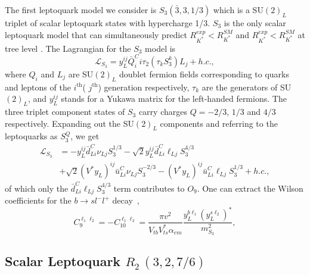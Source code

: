 \documentclass[12pt]{revtex4-2}
\numberwithin{equation}{section}
\begin{document}
 The first leptoquark model we consider is $S_{3}(\bar{3},3,1/3)$ which is a SU$(2)_L$ triplet of scalar leptoquark states with hypercharge 1/3. $S_{3}$ is the only scalar leptoquark model that can simultaneously predict $R_{K^{*}}^{exp} < R_{K^{*}}^{SM}$ and $R_{K^{*}}^{exp} < R_{K^{*}}^{SM}$ at tree level \cite{Dorsner:2017ufx, Hiller:2014yaa, Hiller:2017bzc, Hati:2018fzc}. The Lagrangian for the $S_{3}$ model is
\begin{equation}
    \mathcal{L}_{S_{3}} = y^{ij}_{L}\bar{Q}^{C}_{i}i\tau_{2}(\tau_{k}S^{k}_{3})L_{j} + h.c.,
\end{equation}
where $Q_i$ and $L_j$ are SU$(2)_L$ doublet fermion fields corresponding to quarks and leptons of the $i^\mathrm{th}$(  $j^\mathrm{th}$) generation respectively, $\tau_{k}$ are the generators of SU$(2)_L$, and $y_{L}^{ij}$ stands for a Yukawa matrix for the left-handed fermions.
The three triplet component states of $S_3$ carry charges $Q = -2/3$, $1/3$ and $4/3$ respectively.  Expanding out the SU$(2)_L$ components and referring to the leptoquarks as $S_3^Q$, we get 
\begin{align}\nonumber
    \mathcal{L}_{S_{3}} &= -y^{ij}_{L} \bar d^C_{Li} \nu_{Lj} S_{3}^{1/3} - \sqrt{2}y_{L}^{ij}\bar d^{C}_{Li} \ell_{Lj} S_{3}^{4/3}\\
    & + \sqrt{2}(V^{*}y_{L})^{ij}\bar u^{C}_{Li}\nu_{Lj} S_{3}^{-2/3} 
    - (V^{*}y_{L})^{ij} \bar u^{C}_{Li} \ell_{Lj}S_{3}^{1/3} + h.c.,
\end{align}
of which only the $\bar d^{C}_{Li} \ell_{Lj} S_{3}^{4/3}$ term contributes to $O_9$.  One can extract the Wilson coefficients for the $b \to sl^{-}l^{+}$ decay~\cite{Angelescu:2018tyl, Angelescu:2021lln, Becirevic:2016oho, Descotes-Genon:2015uva}, 
\begin{equation}\label{S3-C9}
    C_{9}^{\ell_1 \ell_2} = -C^{\ell_1 \ell_2}_{10} = \frac{\pi v^{2}}{V_{tb}V_{ts}^{*}\alpha_{em}}\frac{y^{b\ell_1}_{L}(y_{L}^{s\ell_2})^{*}}{m^{2}_{S_{3}}},
\end{equation}

\subsection{Scalar Leptoquark $R_{2}\,(3,2,7/6)$}
\end{document}
